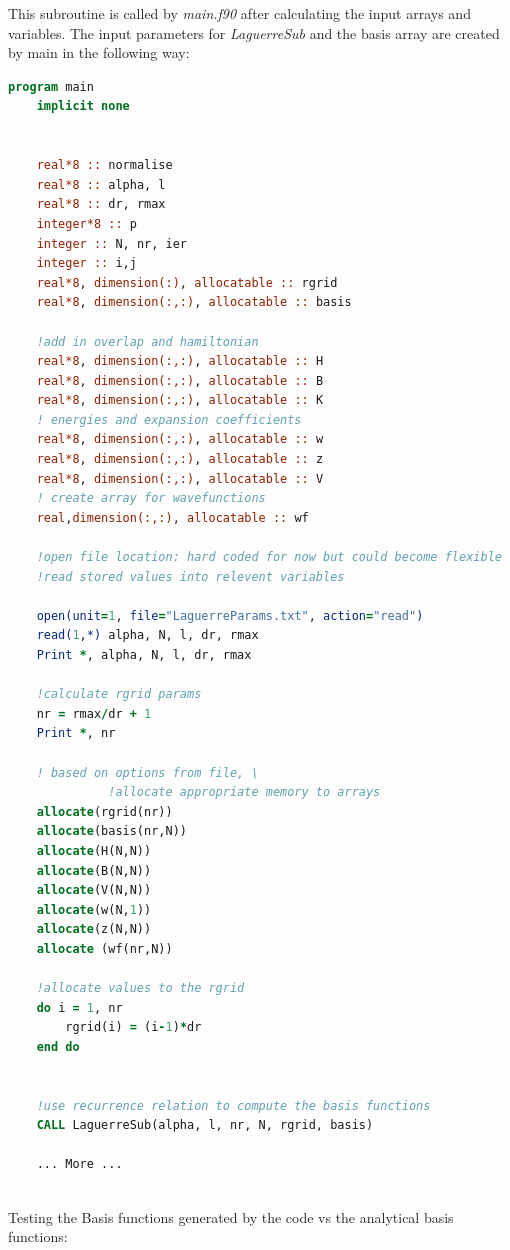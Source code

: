 \documentclass{article}
\begin{document}
    This subroutine is called by \textit{main.f90} after calculating the input arrays and variables. The input parameters for \textit{LaguerreSub} and the basis array are created by main in the following way:
\begin{lstlisting}[language=Fortran]
program main
	implicit none
	
	
	real*8 :: normalise
	real*8 :: alpha, l
	real*8 :: dr, rmax
	integer*8 :: p
	integer :: N, nr, ier
	integer :: i,j
	real*8, dimension(:), allocatable :: rgrid
	real*8, dimension(:,:), allocatable :: basis
	
	!add in overlap and hamiltonian
	real*8, dimension(:,:), allocatable :: H
	real*8, dimension(:,:), allocatable :: B
	real*8, dimension(:,:), allocatable :: K
	! energies and expansion coefficients
	real*8, dimension(:,:), allocatable :: w
	real*8, dimension(:,:), allocatable :: z
	real*8, dimension(:,:), allocatable :: V
	! create array for wavefunctions
	real,dimension(:,:), allocatable :: wf
	
	!open file location: hard coded for now but could become flexible
	!read stored values into relevent variables
	
	open(unit=1, file="LaguerreParams.txt", action="read")
	read(1,*) alpha, N, l, dr, rmax
	Print *, alpha, N, l, dr, rmax
	
	!calculate rgrid params
	nr = rmax/dr + 1
	Print *, nr
	
	! based on options from file, \
	          !allocate appropriate memory to arrays
	allocate(rgrid(nr))
	allocate(basis(nr,N))
	allocate(H(N,N))
	allocate(B(N,N))
	allocate(V(N,N))
	allocate(w(N,1))
	allocate(z(N,N))
	allocate (wf(nr,N))
	
	!allocate values to the rgrid
	do i = 1, nr
		rgrid(i) = (i-1)*dr
	end do
	
	
	!use recurrence relation to compute the basis functions
	CALL LaguerreSub(alpha, l, nr, N, rgrid, basis)
	
	... More ...
	
\end{lstlisting}
    
    
    Testing the Basis functions generated by the code vs the analytical basis functions:
    
\end{document}
